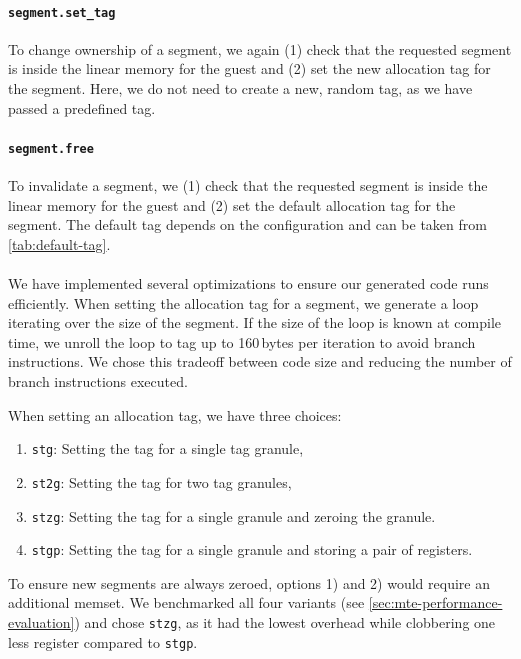 \paragraph{\texttt{segment.set\_tag}} To change ownership of a segment, we again (1) check that the requested segment is inside the linear memory for the guest and (2) set the new allocation tag for the segment.
Here, we do not need to create a new, random tag, as we have passed a predefined tag.

\paragraph{\texttt{segment.free}} To invalidate a segment, we (1) check that the requested segment is inside the linear memory for the guest and (2) set the default allocation tag for the segment.
The default tag depends on the configuration and can be taken from \cref{tab:default-tag}.

\paragraph{}
We have implemented several optimizations to ensure our generated code runs efficiently.
When setting the allocation tag for a segment, we generate a loop iterating over the size of the segment.
If the size of the loop is known at compile time, we unroll the loop to tag up to 160\,bytes per iteration to avoid branch instructions.
We chose this tradeoff between code size and reducing the number of branch instructions executed.

When setting an allocation tag, we have three choices:
\begin{enumerate}
  \item \texttt{stg}: Setting the tag for a single tag granule,
  \item \texttt{st2g}: Setting the tag for two tag granules,
  \item \texttt{stzg}: Setting the tag for a single granule and zeroing the granule.
  \item \texttt{stgp}: Setting the tag for a single granule and storing a pair of registers.
\end{enumerate}

To ensure new segments are always zeroed, options 1) and 2) would require an additional memset.
We benchmarked all four variants (see \cref{sec:mte-performance-evaluation}) and chose \texttt{stzg}, as it had the lowest overhead while clobbering one less register compared to \texttt{stgp}.

